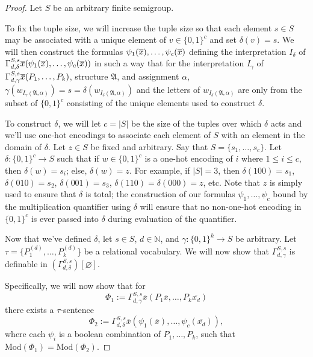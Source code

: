 \documentclass[a4paper,UKenglish,cleveref, autoref, thm-restate, anonymous]{lipics-v2021}
\begin{document}
\begin{proof}
    Let $S$ be an arbitrary finite semigroup. 
    
    To fix the tuple size, we will increase the tuple size so that each element $s \in S$ may be associated with a unique element of $v \in \{0,1\}^c$ and set $\delta(v) = s$. We will then construct the formulas $\psi_1(\overline{x}),\dots,\psi_c(\overline{x})$ defining the interpretation $I_\delta$ of $\Gamma^{S,s}_{d,\delta}\overline{x}(\psi_1(\overline{x}), \dots, \psi_c(\overline{x}))$ in such a way that for the interpretation $I_\gamma$ of $\Gamma^{S,s}_{d,\gamma}\overline{x}(P_1,\dots,P_k)$, structure $\mathfrak{A}$, and assignment $\alpha$, $\gamma(w_{I_\gamma(\mathfrak{A},\alpha)}) = s = \delta(w_{I_\delta(\mathfrak{A},\alpha)})$ and the letters of $w_{I_\delta(\mathfrak{A}, \alpha)}$ are only from the subset of $\{0,1\}^c$ consisting of the unique elements used to construct $\delta$. 

    To construct $\delta$, we will let $c = |S|$ be the size of the tuples over which $\delta$ acts and we'll use one-hot encodings to associate each element of $S$ with an element in the domain of $\delta$. Let $z \in S$ be fixed and arbitrary. Say that $S = \{s_1, \dots, s_c\}$. Let $\delta : \{0,1\}^c \rightarrow S$ such that if $w \in \{0,1\}^c$ is a one-hot encoding of $i$ where $1 \leq i \leq c$, then $\delta(w) = s_i$; else, $\delta(w) = z$. For example, if $|S| = 3$, then $\delta(100) = s_1$, $\delta(010) = s_2$, $\delta(001) = s_3$, $\delta(110) = \delta(000) = z$, etc. Note that $z$ is simply used to ensure that $\delta$ is total; the construction of our formulas $\psi_1,\dots,\psi_c$ bound by the multiplication quantifier using $\delta$ will ensure that no non-one-hot encoding in $\{0,1\}^c$ is ever passed into $\delta$ during evaluation of the quantifier.

    Now that we've defined $\delta$, let $s \in S$, $d \in \mathbb{N}$, and $\gamma : \{0,1\}^k \rightarrow S$ be arbitrary. Let $\tau = \{P_1^{(d)}, \dots, P_k^{(d)}$\} be a relational vocabulary. We will now show that $\Gamma^{S,s}_{d,\gamma}$ is definable in $(\Gamma^{S,s}_{d,\delta})[\varnothing]$.

    Specifically, we will now show that for \[
        \Phi_1 := \Gamma^{S,s}_{d,\gamma}\overline{x}( P_1 \overline{x}, \dots, P_k \overline{x_d})
    \] there exists a $\tau$-sentence \[
        \Phi_2 := \Gamma^{S,s}_{d,\delta}\overline{x}( \psi_1(\overline{x}), \dots, \psi_c(\overline{x_d})),
    \] where each $\psi_i$ is a boolean combination of $P_1,\dots,P_k$,
    such that \(
        \text{Mod}(\Phi_1) = \text{Mod}(\Phi_2)
    \).
    

\end{proof}
\end{document}
